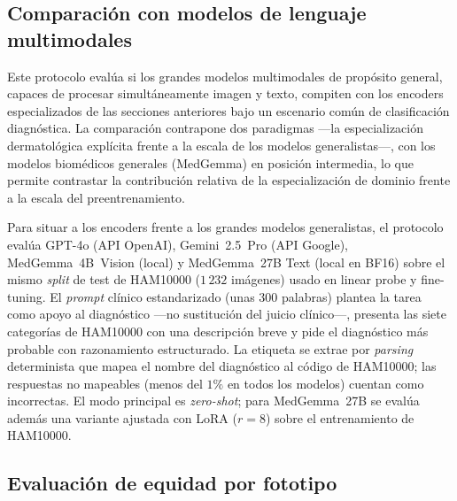\subsection{Comparación con modelos de lenguaje multimodales}
\label{sec:llm}

Este protocolo evalúa si los grandes modelos multimodales de
propósito general, capaces de procesar simultáneamente imagen y
texto, compiten con los encoders especializados de las secciones
anteriores bajo un escenario común de clasificación diagnóstica. La
comparación contrapone dos paradigmas ---la especialización
dermatológica explícita frente a la escala de los modelos
generalistas---, con los modelos biomédicos generales (MedGemma) en
posición intermedia, lo que permite contrastar la contribución
relativa de la especialización de dominio frente a la escala del
preentrenamiento.

Para situar a los encoders frente a los grandes modelos
generalistas, el protocolo evalúa GPT-4o (API OpenAI),
Gemini~2.5~Pro (API Google), MedGemma~4B~Vision (local) y
MedGemma~27B Text (local en BF16) sobre el mismo \emph{split} de
test de HAM10000 ($1\,232$ imágenes) usado en linear probe y
fine-tuning. El \emph{prompt} clínico estandarizado (unas $300$
palabras) plantea la tarea como apoyo al diagnóstico —no
sustitución del juicio clínico—, presenta las siete categorías de
HAM10000 con una descripción breve y pide el diagnóstico más
probable con razonamiento estructurado. La etiqueta se extrae por
\emph{parsing} determinista que mapea el nombre del diagnóstico al
código de HAM10000; las respuestas no mapeables (menos del $1\%$
en todos los modelos) cuentan como incorrectas. El modo principal es
\emph{zero-shot}; para MedGemma~27B se evalúa además una variante
ajustada con LoRA ($r = 8$) sobre el entrenamiento de HAM10000.

\subsection{Evaluación de equidad por fototipo}
\label{sec:equidad}


